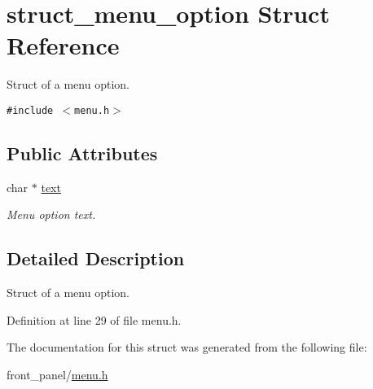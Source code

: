 \hypertarget{structstruct__menu__option}{
\section{struct\_\-menu\_\-option Struct Reference}
\label{structstruct__menu__option}
}
Struct of a menu option.  


{\tt \#include $<$menu.h$>$}

\subsection*{Public Attributes}
\begin{CompactItemize}
\item 
\hypertarget{structstruct__menu__option_d59830a94a1bdec5ecffb3d25e1c8aa1}{
char $\ast$ \hyperlink{structstruct__menu__option_d59830a94a1bdec5ecffb3d25e1c8aa1}{text}}
\label{structstruct__menu__option_d59830a94a1bdec5ecffb3d25e1c8aa1}

\begin{CompactList}\small\item\em Menu option text. \item\end{CompactList}\end{CompactItemize}


\subsection{Detailed Description}
Struct of a menu option. 

Definition at line 29 of file menu.h.

The documentation for this struct was generated from the following file:\begin{CompactItemize}
\item 
front\_\-panel/\hyperlink{menu_8h}{menu.h}\end{CompactItemize}
